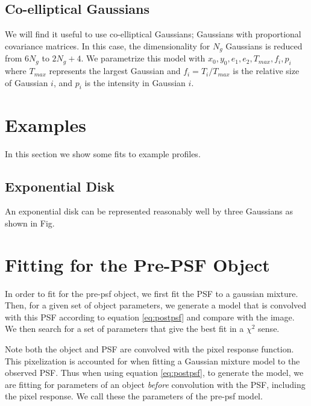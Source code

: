 \documentclass[12pt,preprint]{aastex}
\begin{document}
\subsection{Co-elliptical Gaussians}

We will find it useful to use co-elliptical Gaussians; Gaussians with
proportional covariance matrices.  In this case, the dimensionality for $N_g$
Gaussians is reduced from $6 N_g$ to $2 N_g + 4$.  We parametrize this model
with $x_0, y_0, e_1, e_2, T_{max}, f_{i}, p_{i}$ where $T_{max}$ represents
the largest Gaussian and $f_{i} = T_{i}/T_{max}$ is the relative size of
Gaussian $i$, and $p_i$ is the intensity in Gaussian $i$.


\section{Examples}

In this section we show some fits to example profiles.

\subsection{Exponential Disk}

An exponential disk can be represented reasonably well by three Gaussians
as shown in Fig. 






\section{Fitting for the Pre-PSF Object}

In order to fit for the pre-psf object, we first fit the PSF to a gaussian
mixture.  Then, for a given set of object parameters, we generate a model that
is convolved with this PSF according to equation \ref{eq:postpsf} and compare
with the image.  We then search for a set of parameters that give the best fit
in a $\chi^2$ sense.  

Note both the object and PSF are convolved with the pixel response function.
This pixelization is accounted for when fitting a Gaussian mixture model to the
observed PSF.  Thus when using equation \ref{eq:postpsf}, to generate the
model, we are fitting for parameters of an object {\it before} convolution with
the PSF, including the pixel response.  We call these the parameters of the
pre-psf model.
\end{document}
